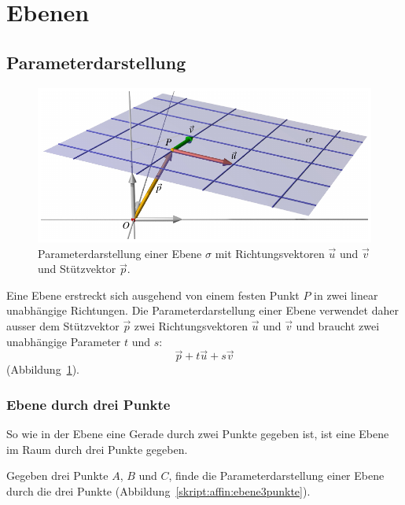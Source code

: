 %
%
%
\section{Ebenen\label{section:ebenen}}

\subsection{Parameterdarstellung}
\begin{figure}
\centering
\includegraphics{3/images/ebene.pdf}
\caption{Parameterdarstellung einer Ebene $\sigma$ mit Richtungsvektoren
$\vec{u}$ und $\vec{v}$ und Stützvektor $\vec{p}$.
\label{skript:affin:ebene}}
\end{figure}
Eine Ebene erstreckt sich ausgehend von einem festen Punkt $P$ in
zwei linear unabhängige Richtungen.
Die Parameterdarstellung einer Ebene verwendet daher ausser dem
Stützvektor $\vec{p}$ zwei Richtungsvektoren $\vec{u}$ und $\vec{v}$
und braucht zwei unabhängige Parameter $t$ und $s$:
\begin{equation}
\vec{p} + t\vec{u} + s\vec{v}
\label{skript:affin:ebene:parameterdarstellung}
\end{equation}
(Abbildung~\ref{skript:affin:ebene}).

\subsubsection{Ebene durch drei Punkte}
So wie in der Ebene eine Gerade durch zwei Punkte gegeben ist, ist eine
Ebene im Raum durch drei Punkte gegeben.

\begin{aufgabe}
Gegeben drei Punkte $A$, $B$ und $C$, finde die Parameterdarstellung einer
Ebene durch die drei Punkte (Abbildung~\ref{skript:affin:ebene3punkte}).
\end{aufgabe}

